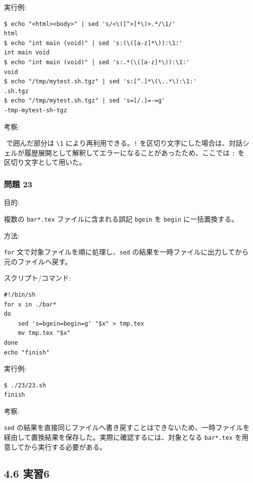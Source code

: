 \documentclass[12pt,a4paper]{jsarticle}
\begin{document}
実行例:\par
\begin{lstlisting}
$ echo "<html><body>" | sed 's/<\([^>]*\)>.*/\1/'
html
$ echo "int main (void)" | sed 's:(\([a-z]*\)):\1:'
int main void
$ echo "int main (void)" | sed 's:.*(\([a-z]*\)):\1:'
void
$ echo "/tmp/mytest.sh.tgz" | sed 's:[^.]*\(\..*\):\1:'
.sh.tgz
$ echo "/tmp/mytest.sh.tgz" | sed 's=[/.]=-=g'
-tmp-mytest-sh-tgz
\end{lstlisting}

考察:\par
\texttt{\(\)} で囲んだ部分は \texttt{\textbackslash 1} により再利用できる。\texttt{!} を区切り文字にした場合は、対話シェルが履歴展開として解釈してエラーになることがあったため、ここでは \texttt{:} を区切り文字として用いた。

\vspace{0.7cm}

\subsubsection*{問題 23}
目的:\par
複数の \texttt{bar*.tex} ファイルに含まれる誤記 \texttt{bgein} を \texttt{begin} に一括置換する。

方法:\par
\texttt{for} 文で対象ファイルを順に処理し、\texttt{sed} の結果を一時ファイルに出力してから元のファイルへ戻す。

スクリプト/コマンド:\par
\begin{lstlisting}
#!/bin/sh
for x in ./bar*
do
    sed 's=bgein=begin=g' "$x" > tmp.tex
    mv tmp.tex "$x"
done
echo "finish"
\end{lstlisting}

実行例:\par
\begin{lstlisting}
$ ./23/23.sh
finish
\end{lstlisting}

考察:\par
\texttt{sed} の結果を直接同じファイルへ書き戻すことはできないため、一時ファイルを経由して置換結果を保存した。実際に確認するには、対象となる \texttt{bar*.tex} を用意してから実行する必要がある。

\vspace{1cm}

\subsection*{4.6 実習6}
\end{document}
